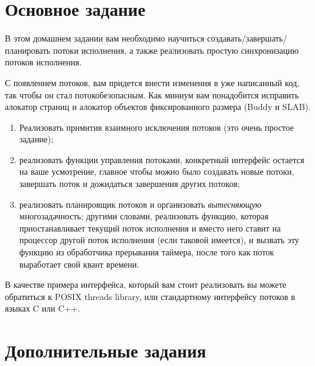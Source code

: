 \section{Основное задание}

В этом домашнем задании вам необходимо научиться создавать/завершать/планировать
потоки исполнения, а также реализовать простую синхронизацию потоков исполнения.

С появлением потоков, вам придется внести изменения в уже написанный код, так
чтобы он стал потокобезопасным. Как миниум вам понадобится исправить алокатор
страниц и алокатор объектов фиксированного размера (Buddy и SLAB).

\begin{enumerate}
  \item Реализовать примитив взаимного исключения потоков (это очень простое
        задание);
  \item реализовать функции управления потоками, конкретный интерфейс остается
        на ваше усмотрение, главное чтобы можно было создавать новые потоки,
        завершать поток и дожидаться завершения других потоков;
  \item реализовать планировщик потоков и организовать \emph{вытесняющую}
        многозадачность; другими словами, реализовать функцию, которая
        приостанавливает текущий поток исполнения и вместо него ставит на
        процессор другой поток исполнения (если таковой имеется), и вызвать эту
        функцию из обработчика прерывания таймера, после того как поток
        выработает свой квант времени.
\end{enumerate}

В качестве примера интерфейса, который вам стоит реализовать вы можете
обратиться к POSIX threads library, или стандартному интерфейсу потоков в языках
C или C++.

\section{Дополнительные задания}

